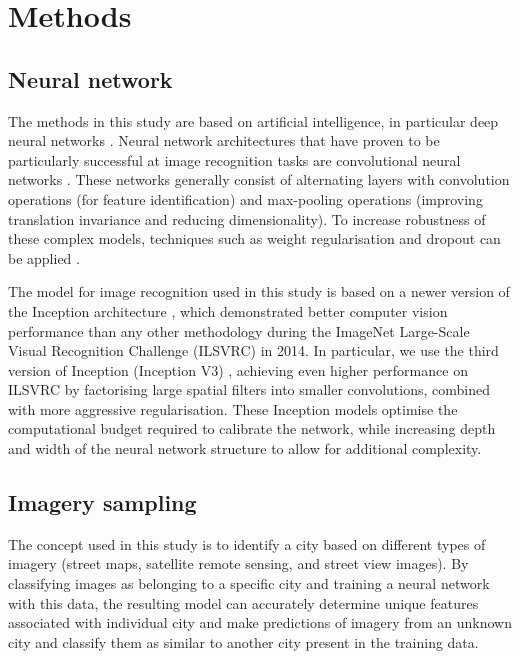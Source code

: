 \documentclass[sageh,times]{sagej}
\begin{document}
\section{Methods}\label{sec:methods}

\subsection{Neural network}\label{sec:methods1}


The methods in this study are based on artificial intelligence, in particular deep neural networks \citep{Bishop1995,Samarasinghe2016,Graupe2013}. Neural network architectures that have proven to be particularly successful at image recognition tasks are convolutional neural networks \citep{Schmidhuber2015}. These networks generally consist of alternating layers with convolution operations (for feature identification) and max-pooling operations (improving translation invariance and reducing dimensionality). To increase robustness of these complex models, techniques such as weight regularisation and dropout can be applied \citep{Srivastava2014}.

The model for image recognition used in this study is based on a newer version of the Inception architecture \citep{Szegedy2015}, which demonstrated better computer vision performance than any other methodology during the ImageNet Large-Scale Visual Recognition Challenge (ILSVRC) \citep{Russakovsky2015} in 2014. In particular, we use the third version of Inception (Inception V3) \citep{Szegedy2015a}, achieving even higher performance on ILSVRC by factorising large spatial filters into smaller convolutions, combined with more aggressive regularisation. These Inception models optimise the computational budget required to calibrate the network, while increasing depth and width of the neural network structure to allow for additional complexity.

\subsection{Imagery sampling}\label{sec:methods2}

The concept used in this study is to identify a city based on different types of imagery (street maps, satellite remote sensing, and street view images). By classifying images as belonging to a specific city and training a neural network with this data, the resulting model can accurately determine unique features associated with individual city and make predictions of imagery from an unknown city and classify them as similar to another city present in the training data.
\end{document}
